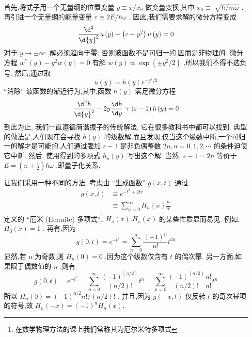 首先,将式子用一个无量纲的位置变量 $y \equiv x/{x}_{0}$ 做变量变换,其中 ${x}_{0} \equiv$ $\sqrt{\hbar /{m\omega }}$ . 再引进一个无量纲的能量变量 $\varepsilon \equiv {2E}/\hbar \omega$ . 因此,我们需要求解的微分方程变成
\begin{equation}
\frac{{\d}^{2}}{\d{y}^{2}}u\left( y\right) + \left( {\varepsilon - {y}^{2}}\right) u\left( y\right) = 0
\end{equation}
对于 $y \rightarrow \pm \infty$ ,解必须趋向于零; 否则波函数不是可归一的,因而是非物理的. 微分方程 ${w}^{\prime \prime }\left( y\right) - {y}^{2}w\left( y\right) = 0$ 有解 $w\left( y\right) \propto \exp \left( {\pm {y}^{2}/2}\right)$ ,所以我们不得不选负号. 然后,通过取
\begin{equation}
u\left( y\right) = h\left( y\right) {e}^{-{y}^{2}/2}
\end{equation}
“消除” 波函数的渐近行为,其中,函数 $h\left( y\right)$ 满足微分方程
\begin{equation}
\frac{{\d}^{2}h}{\d{y}^{2}} - {2y}\frac{\d h}{\d y} + \left( {\varepsilon - 1}\right) h\left( y\right) = 0
\end{equation}
到此为止, 我们一直遵循简谐振子的传统解法, 它在很多教科书中都可以找到. 典型的做法是,人们现在会寻找 $h\left( y\right)$ 的级数解,而且发现,仅当这个级数中断,一个可归一的解才是可能的.人们通过强加 $\varepsilon - 1$ 是非负偶整数 ${2n}, n = 0,1,2,\cdots$ 的条件迫使它中断. 然后, 使用得到的多项式 ${h}_{n}\left( y\right)$ 写出这个解. 当然, $\varepsilon - 1 = {2n}$ 等价于 $E = \left( {n + \frac{1}{2}}\right) \hbar \omega$ ,即量子化关系.

让我们采用一种不同的方法. 考虑由 “生成函数” $g\left( {x, t}\right)$ 通过
\begin{equation}
\begin{aligned}
	g\left( {x, t}\right) &\equiv {e}^{-{t}^{2} + {2tx}}\\
	&\equiv \mathop{\sum }\limits_{{n = 0}}^{\infty }{H}_{n}\left( x\right) \frac{{t}^{n}}{n!}
\end{aligned}
\end{equation}
定义的 “厄米 (Hermite) 多项式”\footnote{在数学物理方法的课上我们常称其为厄尔米特多项式} ${H}_{n}\left( x\right) .{H}_{n}\left( x\right)$ 的某些性质显而易见. 例如, ${H}_{0}\left( x\right)= 1$ . 再有,因为
\begin{equation}
g\left( {0, t}\right) = {e}^{-{t}^{2}} = \mathop{\sum }\limits_{{n = 0}}^{\infty }\frac{{\left( -1\right) }^{n}}{n!}{t}^{2n}
\end{equation}
显然,若 $n$ 为奇数,则 ${H}_{n}\left( 0\right) = 0$ ,因为这个级数仅含有 $t$ 的偶次幂. 另一方面,如果限于偶数值的 $n$ ,则有
\begin{equation}
g\left( {0, t}\right) = {e}^{-{t}^{2}} = \mathop{\sum }\limits_{{n = 0}}^{\infty }\frac{{\left( -1\right) }^{\left( n/2\right) }}{\left( {n/2}\right) !}{t}^{n} = \mathop{\sum }\limits_{{n = 0}}^{\infty }\frac{{\left( -1\right) }^{\left( n/2\right) }}{\left( {n/2}\right) !}\frac{n!}{n!}{t}^{n} 
\end{equation}
所以 ${H}_{n}\left( 0\right) = {\left( -1\right) }^{n/2}n!/\left( {n/2}\right) !$ . 并且,因为 $g\left( {-x, t}\right)$ 仅反转 $t$ 的奇次幂项的符号,故 ${H}_{n}\left( {-x}\right) = {\left( -1\right) }^{n}{H}_{n}\left( x\right) .$

